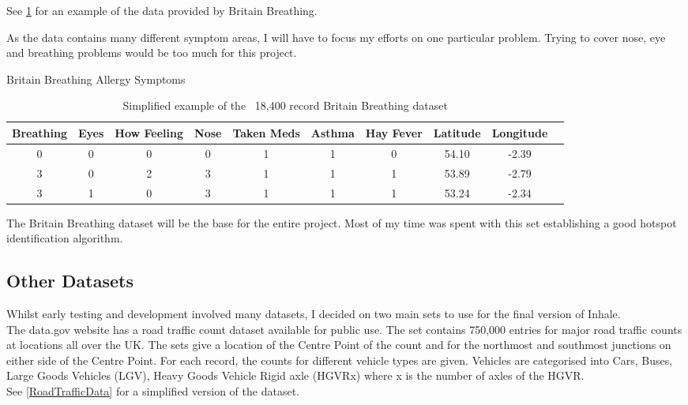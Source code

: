 See \ref{bbdatatable} for an example of the data provided by Britain Breathing.

As the data contains many different symptom areas, I will have to focus my efforts on one particular problem. Trying to cover nose, eye and breathing problems would be too much for this project.


\begin{table}
\begin{center}
Britain Breathing Allergy Symptoms\\
\begin{tabular}{|c|c|c|c|c|c|c|c|c|c}\hline\hline
Breathing&Eyes&How Feeling&Nose&Taken Meds&Asthma&Hay Fever&Latitude&Longitude\\\hline
0&0&0&0&1&1&0&54.10&-2.39\\
3&0&2&3&1&1&1&53.89&-2.79\\
3&1&0&3&1&1&1&53.24&-2.34\\\hline\hline
\end{tabular}
\end{center}
\caption{Simplified example of the ~18,400 record Britain Breathing dataset}\label{bbdatatable}
\end{table}

The Britain Breathing dataset will be the base for the entire project. Most of my time was spent with this set establishing a good hotspot identification algorithm.

\subsection{Other Datasets}

Whilst early testing and development involved many datasets, I decided on two main sets to use for the final version of Inhale.\\

The data.gov website has a road traffic count dataset available for public use. The set contains  750,000 entries for major road traffic counts at locations all over the UK. The sets give a location of the Centre Point of the count and for the northmost and southmost junctions on either side of the Centre Point. For each record, the counts for different vehicle types are given. Vehicles are categorised into Cars, Buses, Large Goods Vehicles (LGV), Heavy Goods Vehicle Rigid axle (HGVRx) where x is the number of axles of the HGVR.\\

See \ref{RoadTrafficData} for a simplified version of the dataset.\\

